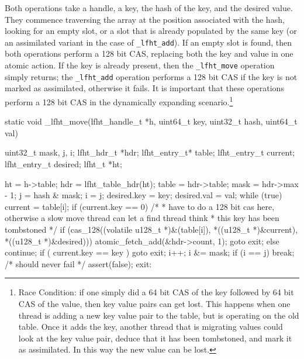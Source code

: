 Both operations take a handle, a key, the hash of the key, and the
desired value. They commence traversing the array at the position
associated with the hash, looking for an empty slot, or a slot that is
already populated by the same key (or an assimilated variant in the
case of \texttt{\_lfht\_add}). If an empty slot is found, then both operations
perform a 128 bit CAS, replacing both the key and value in one atomic action.
If the key is already present, then the \texttt{\_lfht\_move} operation simply
returns; the \texttt{\_lfht\_add} operation performs a 128 bit CAS if the key
is not marked as assimilated, otherwise it fails. It is important that these operations
perform a 128 bit CAS in the dynamically expanding scenario.\footnote{Race Condition: if one simply
  did a 64 bit CAS of the key followed by 64 bit CAS of the value, then key value pairs can get lost.
  This happens when one thread is adding a new key value pair to the table, but is operating on the
  old table. Once it adds the key, another thread that is migrating values could look at the
  key value pair, deduce that it has been tombstoned, and mark it as assimilated. In this way
  the new value can be lost.}



\begin{center}
\begin{clisting}
static void _lfht_move(lfht_handle_t *h, uint64_t key, uint32_t hash, uint64_t val){
  uint32_t mask, j, i;
  lfht_hdr_t *hdr;
  lfht_entry_t*  table;
  lfht_entry_t current;
  lfht_entry_t desired;
  lfht_t *ht;

  ht = h->table;
  hdr = lfht_table_hdr(ht);
  table = hdr->table;
  mask = hdr->max - 1;
  j = hash & mask;
  i = j;
  desired.key = key;
  desired.val = val;
  while (true) {
    current = table[i];
    if (current.key == 0){
      /* 
       * have to do a 128 bit cas here, otherwise a slow move thread can let a find thread think
       * this key has been tombstoned
       */
      if (cas_128((volatile u128_t *)&(table[i]), *((u128_t *)&current),  *((u128_t *)&desired))){
        atomic_fetch_add(&hdr->count, 1);
        goto exit;
      } else {
        continue;
      }
    }
    if ( current.key ==  key ){
      goto exit;
    }
    i++;
    i &= mask;
    if (i == j) break;
  }
  /* should never fail */
  assert(false);
 exit:
}
\end{clisting}
\end{center}




